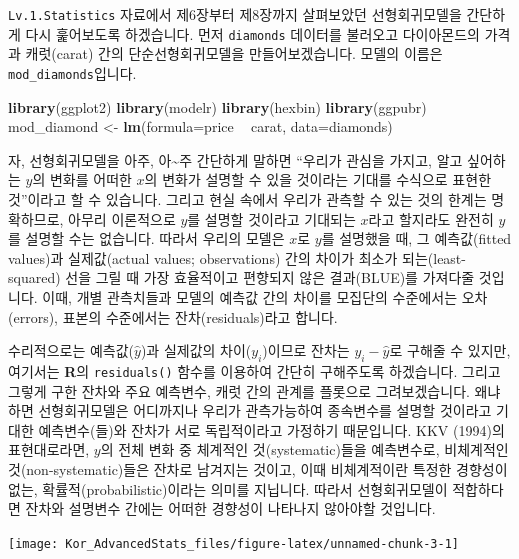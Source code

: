 \documentclass[
]{book}
\newenvironment{Shaded}{\begin{snugshade}}{\end{snugshade}}
\newcommand{\DataTypeTok}[1]{\textcolor[rgb]{0.13,0.29,0.53}{#1}}
\newcommand{\KeywordTok}[1]{\textcolor[rgb]{0.13,0.29,0.53}{\textbf{#1}}}
\newcommand{\NormalTok}[1]{#1}
\newcommand{\OperatorTok}[1]{\textcolor[rgb]{0.81,0.36,0.00}{\textbf{#1}}}
\newcommand{\StringTok}[1]{\textcolor[rgb]{0.31,0.60,0.02}{#1}}
\begin{document}
\texttt{Lv.1.Statistics} 자료에서 제6장부터 제8장까지 살펴보았던 선형회귀모델을 간단하게 다시 훑어보도록 하겠습니다. 먼저 \texttt{diamonds} 데이터를 불러오고 다이아몬드의 가격과 캐럿(carat) 간의 단순선형회귀모델을 만들어보겠습니다. 모델의 이름은 \texttt{mod\_diamonds}입니다.

\begin{Shaded}
\begin{Highlighting}[]
\KeywordTok{library}\NormalTok{(ggplot2)}
\KeywordTok{library}\NormalTok{(modelr)}
\KeywordTok{library}\NormalTok{(hexbin)}
\KeywordTok{library}\NormalTok{(ggpubr)}
\NormalTok{mod_diamond <-}\StringTok{ }\KeywordTok{lm}\NormalTok{(}\DataTypeTok{formula=}\NormalTok{price }\OperatorTok{~}\StringTok{ }\NormalTok{carat, }\DataTypeTok{data=}\NormalTok{diamonds)}
\end{Highlighting}
\end{Shaded}

자, 선형회귀모델을 아주, 아\textasciitilde 주 간단하게 말하면 ``우리가 관심을 가지고, 알고 싶어하는 \(y\)의 변화를 어떠한 \(x\)의 변화가 설명할 수 있을 것이라는 기대를 수식으로 표현한 것''이라고 할 수 있습니다. 그리고 현실 속에서 우리가 관측할 수 있는 것의 한계는 명확하므로, 아무리 이론적으로 \(y\)를 설명할 것이라고 기대되는 \(x\)라고 할지라도 완전히 \(y\)를 설명할 수는 없습니다. 따라서 우리의 모델은 \(x\)로 \(y\)를 설명했을 때, 그 예측값(fitted values)과 실제값(actual values; observations) 간의 차이가 최소가 되는(least-squared) 선을 그릴 때 가장 효율적이고 편향되지 않은 결과(BLUE)를 가져다줄 것입니다. 이때, 개별 관측치들과 모델의 예측값 간의 차이를 모집단의 수준에서는 오차(errors), 표본의 수준에서는 잔차(residuals)라고 합니다.

수리적으로는 예측값(\(\hat{y}\))과 실제값의 차이(\(y_i\))이므로 잔차는 \(y_i - \hat{y}\)로 구해줄 수 있지만, 여기서는 \textbf{R}의 \texttt{residuals()} 함수를 이용하여 간단히 구해주도록 하겠습니다. 그리고 그렇게 구한 잔차와 주요 예측변수, 캐럿 간의 관계를 플롯으로 그려보겠습니다. 왜냐하면 선형회귀모델은 어디까지나 우리가 관측가능하여 종속변수를 설명할 것이라고 기대한 예측변수(들)와 잔차가 서로 독립적이라고 가정하기 때문입니다. KKV (1994)의 표현대로라면, \(y\)의 전체 변화 중 체계적인 것(systematic)들을 예측변수로, 비체계적인 것(non-systematic)들은 잔차로 남겨지는 것이고, 이때 비체계적이란 특정한 경향성이 없는, 확률적(probabilistic)이라는 의미를 지닙니다. 따라서 선형회귀모델이 적합하다면 잔차와 설명변수 간에는 어떠한 경향성이 나타나지 않아야할 것입니다.

\begin{center}\texttt{[image: Kor\_AdvancedStats\_files/figure-latex/unnamed-chunk-3-1]} \end{center}
\end{document}
